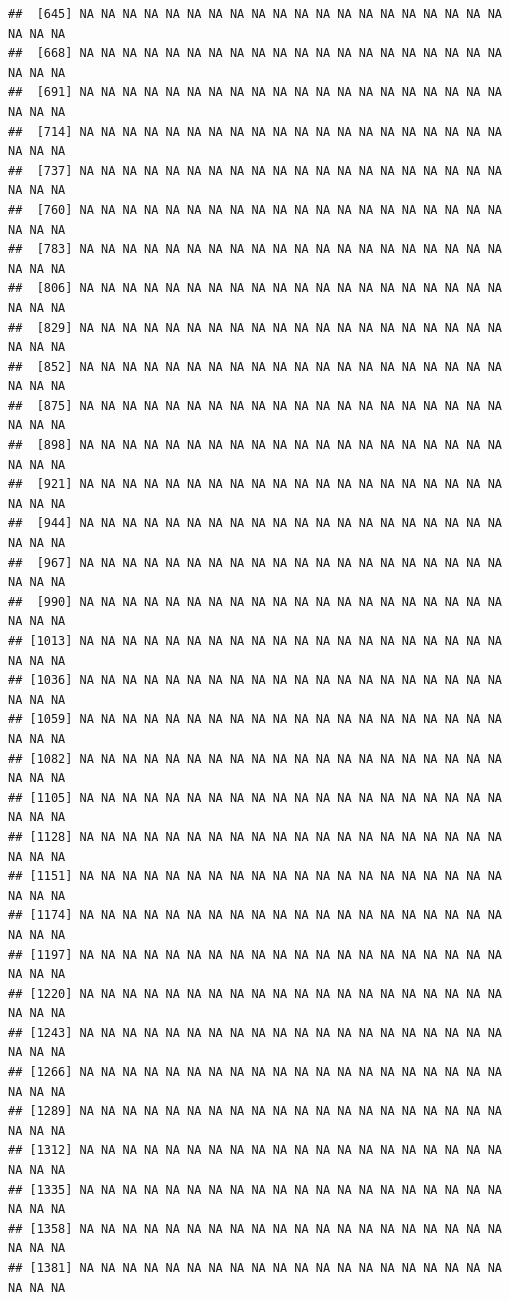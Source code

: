 \documentclass{article}\usepackage[]{graphicx}\usepackage[]{color}
\makeatletter
\newenvironment{kframe}{%
 \def\at@end@of@kframe{}%
 \ifinner\ifhmode%
  \def\at@end@of@kframe{\end{minipage}}%
  \begin{minipage}{\columnwidth}%
 \fi\fi%
 \def\FrameCommand##1{\hskip\@totalleftmargin \hskip-\fboxsep
 \colorbox{shadecolor}{##1}\hskip-\fboxsep
     \hskip-\linewidth \hskip-\@totalleftmargin \hskip\columnwidth}%
 \MakeFramed {\advance\hsize-\width
   \@totalleftmargin\z@ \linewidth\hsize
   \@setminipage}}%
 {\par\unskip\endMakeFramed%
 \at@end@of@kframe}
\newenvironment{knitrout}{}{} %
\makeatother
\begin{document}
\begin{knitrout}
\begin{kframe}
\begin{verbatim}
##  [645] NA NA NA NA NA NA NA NA NA NA NA NA NA NA NA NA NA NA NA NA NA NA NA
##  [668] NA NA NA NA NA NA NA NA NA NA NA NA NA NA NA NA NA NA NA NA NA NA NA
##  [691] NA NA NA NA NA NA NA NA NA NA NA NA NA NA NA NA NA NA NA NA NA NA NA
##  [714] NA NA NA NA NA NA NA NA NA NA NA NA NA NA NA NA NA NA NA NA NA NA NA
##  [737] NA NA NA NA NA NA NA NA NA NA NA NA NA NA NA NA NA NA NA NA NA NA NA
##  [760] NA NA NA NA NA NA NA NA NA NA NA NA NA NA NA NA NA NA NA NA NA NA NA
##  [783] NA NA NA NA NA NA NA NA NA NA NA NA NA NA NA NA NA NA NA NA NA NA NA
##  [806] NA NA NA NA NA NA NA NA NA NA NA NA NA NA NA NA NA NA NA NA NA NA NA
##  [829] NA NA NA NA NA NA NA NA NA NA NA NA NA NA NA NA NA NA NA NA NA NA NA
##  [852] NA NA NA NA NA NA NA NA NA NA NA NA NA NA NA NA NA NA NA NA NA NA NA
##  [875] NA NA NA NA NA NA NA NA NA NA NA NA NA NA NA NA NA NA NA NA NA NA NA
##  [898] NA NA NA NA NA NA NA NA NA NA NA NA NA NA NA NA NA NA NA NA NA NA NA
##  [921] NA NA NA NA NA NA NA NA NA NA NA NA NA NA NA NA NA NA NA NA NA NA NA
##  [944] NA NA NA NA NA NA NA NA NA NA NA NA NA NA NA NA NA NA NA NA NA NA NA
##  [967] NA NA NA NA NA NA NA NA NA NA NA NA NA NA NA NA NA NA NA NA NA NA NA
##  [990] NA NA NA NA NA NA NA NA NA NA NA NA NA NA NA NA NA NA NA NA NA NA NA
## [1013] NA NA NA NA NA NA NA NA NA NA NA NA NA NA NA NA NA NA NA NA NA NA NA
## [1036] NA NA NA NA NA NA NA NA NA NA NA NA NA NA NA NA NA NA NA NA NA NA NA
## [1059] NA NA NA NA NA NA NA NA NA NA NA NA NA NA NA NA NA NA NA NA NA NA NA
## [1082] NA NA NA NA NA NA NA NA NA NA NA NA NA NA NA NA NA NA NA NA NA NA NA
## [1105] NA NA NA NA NA NA NA NA NA NA NA NA NA NA NA NA NA NA NA NA NA NA NA
## [1128] NA NA NA NA NA NA NA NA NA NA NA NA NA NA NA NA NA NA NA NA NA NA NA
## [1151] NA NA NA NA NA NA NA NA NA NA NA NA NA NA NA NA NA NA NA NA NA NA NA
## [1174] NA NA NA NA NA NA NA NA NA NA NA NA NA NA NA NA NA NA NA NA NA NA NA
## [1197] NA NA NA NA NA NA NA NA NA NA NA NA NA NA NA NA NA NA NA NA NA NA NA
## [1220] NA NA NA NA NA NA NA NA NA NA NA NA NA NA NA NA NA NA NA NA NA NA NA
## [1243] NA NA NA NA NA NA NA NA NA NA NA NA NA NA NA NA NA NA NA NA NA NA NA
## [1266] NA NA NA NA NA NA NA NA NA NA NA NA NA NA NA NA NA NA NA NA NA NA NA
## [1289] NA NA NA NA NA NA NA NA NA NA NA NA NA NA NA NA NA NA NA NA NA NA NA
## [1312] NA NA NA NA NA NA NA NA NA NA NA NA NA NA NA NA NA NA NA NA NA NA NA
## [1335] NA NA NA NA NA NA NA NA NA NA NA NA NA NA NA NA NA NA NA NA NA NA NA
## [1358] NA NA NA NA NA NA NA NA NA NA NA NA NA NA NA NA NA NA NA NA NA NA NA
## [1381] NA NA NA NA NA NA NA NA NA NA NA NA NA NA NA NA NA NA NA NA NA NA NA

\end{verbatim}
\end{kframe}
\end{knitrout}
\end{document}
